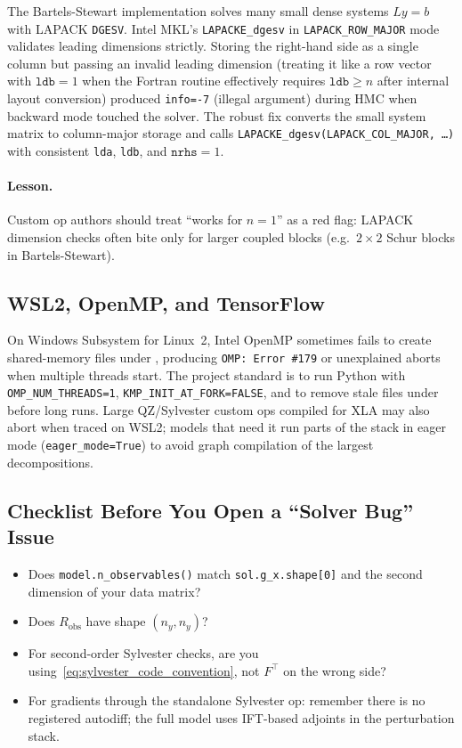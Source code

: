 \documentclass[11pt,a4paper]{article}
\theoremstyle{definition}
\newcommand{\code}[1]{\texttt{\color{codecolor}#1}}
\begin{document}
	The Bartels-Stewart implementation solves many small dense systems $L y = b$ with LAPACK \code{DGESV}.
	Intel MKL's \code{LAPACKE\_dgesv} in \code{LAPACK\_ROW\_MAJOR} mode validates leading dimensions strictly.
	Storing the right-hand side as a single column but passing an invalid leading dimension (treating it like a row vector with $\texttt{ldb}=1$ when the Fortran routine effectively requires $\texttt{ldb} \geq n$ after internal layout conversion) produced \code{info=-7} (illegal argument) during HMC when backward mode touched the solver.
	The robust fix converts the small system matrix to column-major storage and calls \code{LAPACKE\_dgesv(LAPACK\_COL\_MAJOR, \ldots)} with consistent \texttt{lda}, \texttt{ldb}, and $\texttt{nrhs}=1$.
	
	\paragraph{Lesson.}
	Custom op authors should treat ``works for $n=1$'' as a red flag: LAPACK dimension checks often bite only for larger coupled blocks (e.g.\ $2\times 2$ Schur blocks in Bartels-Stewart).
	
	\subsection{WSL2, OpenMP, and TensorFlow}
	
	On Windows Subsystem for Linux~2, Intel OpenMP sometimes fails to create shared-memory files under , producing \texttt{OMP: Error \#179} or unexplained aborts when multiple threads start.
	The project standard is to run Python with \code{OMP\_NUM\_THREADS=1}, \code{KMP\_INIT\_AT\_FORK=FALSE}, and to remove stale  files under  before long runs.
	Large QZ/Sylvester custom ops compiled for XLA may also abort when traced on WSL2; models that need it run parts of the stack in eager mode (\code{eager\_mode=True}) to avoid graph compilation of the largest decompositions.
	
	\subsection{Checklist Before You Open a ``Solver Bug'' Issue}
	
	\begin{itemize}[leftmargin=*]
		\item Does \code{model.n\_observables()} match \code{sol.g\_x.shape[0]} and the second dimension of your data matrix?
		\item Does $R_{\mathrm{obs}}$ have shape $(n_y, n_y)$?
		\item For second-order Sylvester checks, are you using~\eqref{eq:sylvester_code_convention}, not $F^\top$ on the wrong side?
		\item For gradients through the standalone Sylvester op: remember there is no registered autodiff; the full model uses IFT-based adjoints in the perturbation stack.
	\end{itemize}
	
\end{document}
